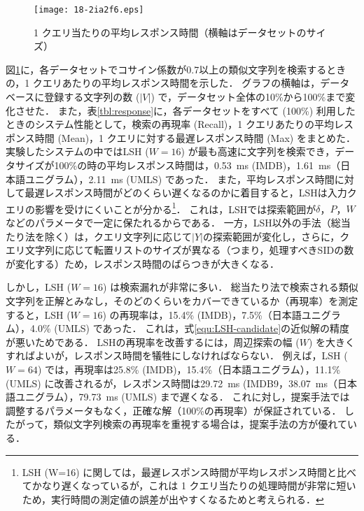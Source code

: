 \documentclass[japanese]{jnlp_JS2.0}
\begin{document}
\begin{figure}[b]
\vspace{-1\baselineskip}
    \begin{center}
\texttt{[image: 18-2ia2f6.eps]}
    \end{center}
    \caption{1 クエリ当たりの平均レスポンス時間（横軸はデータセットのサイズ）}
\label{fig:query-time}
\end{figure}

図\ref{fig:query-time}に，各データセットでコサイン係数が0.7以上の類似文字列を検索するときの，1 クエリあたりの平均レスポンス時間を示した．
グラフの横軸は，データベースに登録する文字列の数 ($|V|$) で，データセット全体の10\%から100\%まで変化させた．
また，表\ref{tbl:response}に，各データセットをすべて (100\%) 利用したときのシステム性能として，検索の再現率 (Recall)，1 クエリあたりの平均レスポンス時間 (Mean)，1 クエリに対する最遅レスポンス時間 (Max) をまとめた．
実験したシステムの中ではLSH ($W=16$) が最も高速に文字列を検索でき，データサイズが100\%の時の平均レスポンス時間は，0.53~ms (IMDB)，1.61~ms（日本語ユニグラム），2.11~ms (UMLS) であった．
また，平均レスポンス時間に対して最遅レスポンス時間がどのくらい遅くなるのかに着目すると，LSHは入力クエリの影響を受けにくいことが分かる\footnote{LSH (W=16) に関しては，最遅レスポンス時間が平均レスポンス時間と比べてかなり遅くなっているが，これは 1 クエリ当たりの処理時間が非常に短いため，実行時間の測定値の誤差が出やすくなるためと考えられる．}．
これは，LSHでは探索範囲が$\delta$，$P$，$W$などのパラメータで一定に保たれるからである．
一方，LSH以外の手法（総当たり法を除く）は，クエリ文字列に応じて$|Y|$の探索範囲が変化し，さらに，クエリ文字列に応じて転置リストのサイズが異なる（つまり，処理すべきSIDの数が変化する）ため，レスポンス時間のばらつきが大きくなる．


\begin{table}[b]
\label{tbl:response}

\end{table}

しかし，LSH ($W=16$) は検索漏れが非常に多い．
総当たり法で検索される類似文字列を正解とみなし，そのどのくらいをカバーできているか（再現率）を測定すると，LSH ($W=16$) の再現率は，15.4\% (IMDB)，7.5\%（日本語ユニグラム），4.0\% (UMLS) であった．
これは，式\ref{equ:LSH-candidate}の近似解の精度が悪いためである．
LSHの再現率を改善するには，周辺探索の幅 ($W$) を大きくすればよいが，レスポンス時間を犠牲にしなければならない．
例えば，LSH ($W=64$) では，再現率は25.8\% (IMDB)，15.4\%（日本語ユニグラム），11.1\% (UMLS) に改善されるが，レスポンス時間は29.72~ms (IMDB9，38.07~ms（日本語ユニグラム），79.73~ms (UMLS) まで遅くなる．
これに対し，提案手法では調整するパラメータもなく，正確な解（100\%の再現率）が保証されている．
したがって，類似文字列検索の再現率を重視する場合は，提案手法の方が優れている．
\end{document}
